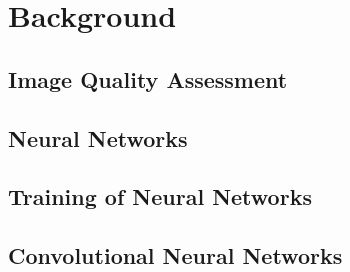 \chapter{Background}

\section{Image Quality Assessment}

\section{Neural Networks}

\section{Training of Neural Networks}

\section{Convolutional Neural Networks}